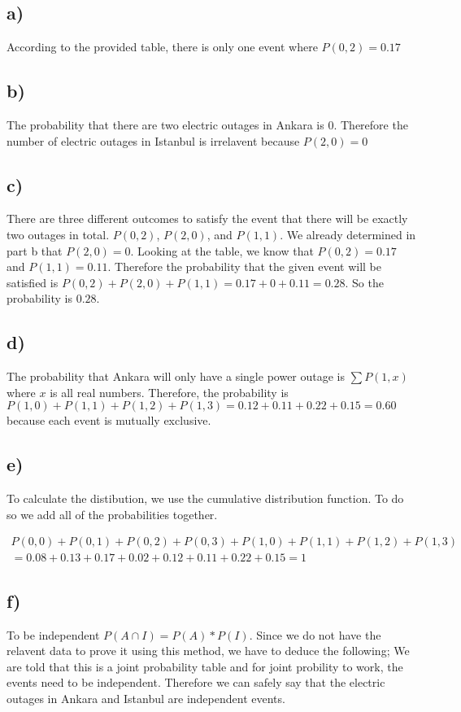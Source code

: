 \documentclass[12pt]{article}
\begin{document}
\subsection*{a)}
According to the provided table, there is only one event where $P(0,2) = 0.17$
\subsection*{b)}
The probability that there are two electric outages in Ankara is 0. Therefore
the number of electric outages in Istanbul is irrelavent because $P(2,0) = 0$
\subsection*{c)}
There are three different outcomes to satisfy the event that there will be 
exactly two outages in total. $P(0,2)$, $P(2,0)$, and $P(1,1)$. We already determined
in part b that $P(2,0) = 0$. Looking at the table, we know that $P(0,2) = 0.17$ and 
$P(1,1) = 0.11$. Therefore the probability that the given event will be satisfied
is $P(0,2) + P(2,0) + P(1,1) = 0.17 + 0 + 0.11 = 0.28$. So the probability is $0.28$.
\subsection*{d)}
The probability that Ankara will only have a single power outage is 
$\sum P(1,x)$ where $x$ is all real numbers. Therefore, the probability is 
$P(1,0) + P(1,1) + P(1,2) + P(1,3) = 0.12 + 0.11 + 0.22 + 0.15 = 0.60$ because
each event is mutually exclusive. 
\subsection*{e)}
To calculate the distibution, we use the cumulative distribution function.
To do so we add all of the probabilities together. 

\begin{align*}
    P(0,0) + P(0,1) + P(0,2) + P(0,3) + P(1,0) + P(1,1) + P(1,2) + P(1,3) \\
    = 0.08+0.13+0.17+0.02+0.12+0.11+0.22+0.15 = 1
\end{align*}

\subsection*{f)}
To be independent $P(A\cap I) = P(A)*P(I)$. Since we do not have the relavent data 
to prove it using this method, we have to deduce the following; We are told that this is 
a joint probability table and for joint probility to work, the events need to be independent.
Therefore we can safely say that the electric outages in Ankara and Istanbul are independent events.
\end{document}
